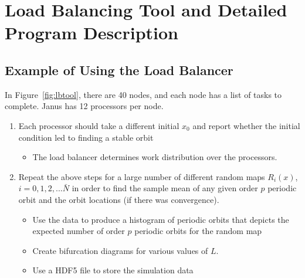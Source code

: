 \chapter{Load Balancing Tool and Detailed Program
  Description}\label{lbdetails}
\section{Example of Using the Load Balancer}
In Figure~\ref{fig:lbtool}, there are 40 nodes, and each node has a
list of tasks to complete. Janus has 12 processors per node. 
\begin{enumerate}
\item Each processor should take a different initial $x_0$ and report
  whether the initial condition led to finding a stable orbit  
\begin{itemize}
\item The load balancer determines work distribution over the processors.
\end{itemize}
\item Repeat the above steps for a large number of different random
  maps $R_i(x)$, $i = 0, 1, 2,... \bar{N}$ in order to find the sample
  mean of any given order $p$ periodic orbit and the orbit locations
  (if there was convergence).
\begin{itemize}
\item Use the data to produce a histogram of periodic orbits that depicts the expected number of order $p$ periodic orbits for the random map
\item Create bifurcation diagrams for various values of $L$.
\item Use a HDF5 file to store the simulation data
\end{itemize}
\end{enumerate}
